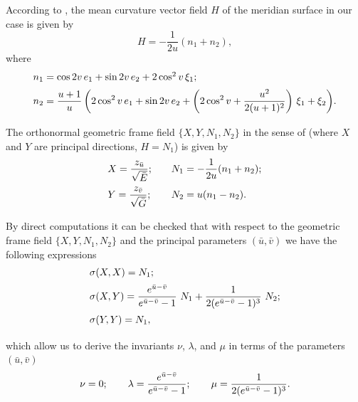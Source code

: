 \documentclass[12pt]{amsart}
\theoremstyle{definition}
\theoremstyle{remark}
\newcommand{\ds}{\displaystyle}
\numberwithin{equation}{section}
\begin{document}
According to \cite{G-M-Med}, the mean curvature vector field $H$ of the meridian surface in our case is given by  
$$H = -\frac{1}{2u} (n_1 + n_2),$$
where 
\begin{equation*} %
	\begin{array}{l}
		\vspace{2mm}
		n_1 =  \cos 2v\,e_1 + \sin 2v \,e_2+ 2 \cos^2 v \, \xi_1;\\
		\vspace{2mm}
		n_2 = \ds{\frac{u+1}{u} \left( 2 \cos^2 v \,e_1 + \sin 2v \,e_2 + \left(2 \cos^2 v + \frac{u^2}{2(u+1)^2}\right)\, \xi_1 +
			\xi_2\right)}.
	\end{array}
\end{equation*}
The orthonormal geometric frame field $\{X,Y,N_1,N_2 \}$ in the sense of \cite{G-M-JMP-2012} (where $X$ and $Y$ are  principal directions, $H = N_1$) is given by
\begin{equation*} 
\begin{array}{ll}
		\vspace{2mm}
X =\ds{\frac{z_{\bar u}}{\sqrt{\bar E}}}; & \quad N_1 = \ds{-\frac{1}{2u} (n_1 + n_2)};\\
		\vspace{2mm}
Y = \ds{\frac{z_{\bar v}}{ \sqrt{\bar G}}}; & \quad N_2 = u (n_1 - n_2).
	\end{array}
\end{equation*} 
By direct computations it can be checked that with respect to the geometric frame field $\{X,Y,N_1,N_2 \}$  and the principal parameters $(\bar u, \bar v)$ we have the following expressions
\begin{equation} \notag
	\begin{array}{l}
		\vspace{2mm}
		\sigma(X,X) =  N_1; \\
		\vspace{2mm}
		\sigma(X,Y) = \ds{\frac{e^{ \bar{u}-\bar{v}}}{e^{ \bar{u}-\bar{v}} -1}}\, \,N_1 + \ds{\frac{1}{2 (e^{ \bar{u}-\bar{v}} -1)^3}}\,\, N_2;  \\
		\vspace{2mm}
		\sigma(Y,Y) = N_1,
	\end{array}
\end{equation}
which allow us to derive the invariants $\nu$, $\lambda$, and  $\mu$ in terms of the parameters $(\bar u, \bar v)$
\begin{equation}\notag
	\nu = 0; \qquad \lambda = \ds{\frac{e^{ \bar{u}-\bar{v}} }{e^{ \bar{u}-\bar{v}} -1}}; \qquad \mu =\ds{ \frac{1}{2 (e^{ \bar{u}-\bar{v}} -1)^3}}.
\end{equation}
\end{document}
